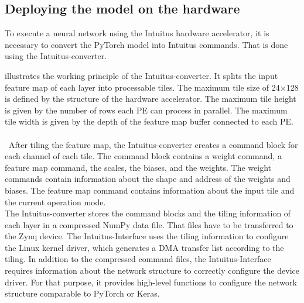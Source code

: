 \documentclass[%
a4paper,
twoside,
openany,
dvipsnames
]
{report}
\let\svfigure\figure
\let\svendfigure\endfigure
\renewenvironment{figure}[1][tb]{\svfigure[#1]\setstretch{1}}
{\svendfigure}
\begin{document}
\subsection{Deploying the model on the hardware}
To execute a neural network using the Intuitus hardware accelerator, it is necessary to convert the PyTorch model into Intuitus commands. That is done using the Intuitus-converter.
\begin{figure}[h]
	\centering
	
	\caption[Model compiler workflow.]{Overview of the model compiler workflow.}
	\label{fig:sw-model-compiler}
\end{figure} 
 illustrates the working principle of the Intuitus-converter. It splits the input feature map of each layer into processable tiles. The maximum tile size of 24$\times$128 is defined by the structure of the hardware accelerator. The maximum tile height is given by the number of rows each \gls{PE} can process in parallel. The maximum tile width is given by the depth of the feature map buffer connected to each \gls{PE}. \\
\\\
After tiling the feature map, the Intuitus-converter creates a command block for each channel of each tile. The command block contains a weight command, a feature map command, the scales, the biases, and the weights. The weight commands contain information about the shape and address of the weights and biases. The feature map command contains information about the input tile and the current operation mode.\\
The Intuitus-converter stores the command blocks and the tiling information of each layer in a compressed NumPy data file. That files have to be transferred to the Zynq device. The Intuitus-Interface uses the tiling information to configure the Linux kernel driver, which generates a \gls{DMA} transfer list according to the tiling. In addition to the compressed command files, the Intuitus-Interface requires information about the network structure to correctly configure the device driver. For that purpose, it provides high-level functions to configure the network structure comparable to PyTorch or Keras.
\end{document}
